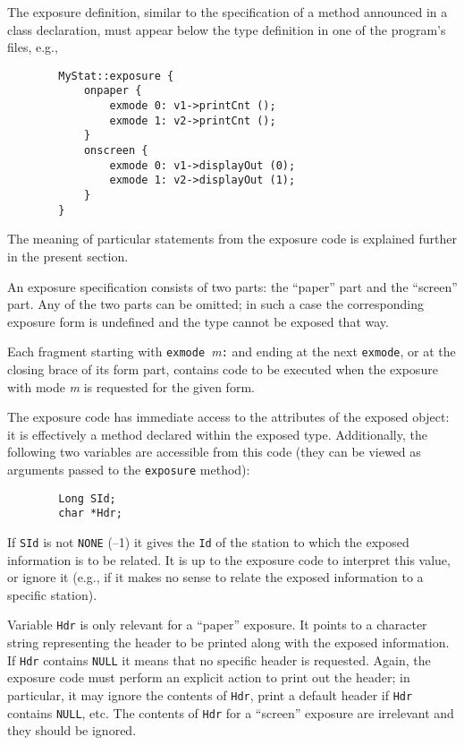 The exposure definition, similar to the specification of a method announced
in a class declaration, must appear below the type definition in one of the
program's files, e.g.,
\begin{verbatim}
        MyStat::exposure {
            onpaper {
                exmode 0: v1->printCnt ();
                exmode 1: v2->printCnt ();
            }
            onscreen {
                exmode 0: v1->displayOut (0);
                exmode 1: v2->displayOut (1);
            }
        }
\end{verbatim}
The meaning of particular statements from the exposure code is explained
further in the present section.

\medskip

\noindent
An exposure specification consists of two parts: the ``paper'' part and the
``screen'' part.
Any of the two parts can be omitted; in such a case the corresponding
exposure form is undefined and the type cannot be exposed that way.

Each fragment starting with {\tt exmode~}{\em m\/}{\tt:}
and ending at the next {\tt exmode},
or at the closing brace of its form part, contains code to be executed when
the exposure with mode {\em m\/} is requested for the given form.

The exposure code has immediate access to the attributes of
the exposed object: it is effectively a method declared within
the exposed type.
Additionally, the following two variables are accessible from this code (they
can be viewed as arguments passed to the {\tt exposure} method):
\begin{verbatim}
        Long SId;
        char *Hdr;
\end{verbatim}

If {\tt SId} is not {\tt NONE} (--1) it gives the {\tt Id} of the station
to which the exposed information is to be related.
It is up to the exposure code to interpret this value, or
ignore it (e.g., if it makes no sense to relate the exposed information to a
specific station).

Variable {\tt Hdr} is only relevant
for a ``paper'' exposure.
It points to a character string
representing the header to be printed along with the exposed information.
If {\tt Hdr} contains {\tt NULL} it means that no specific header is
requested.
Again, the exposure code must perform an explicit action to print out the
header; in particular, it may ignore the contents of {\tt Hdr}, print a
default header if {\tt Hdr} contains {\tt NULL}, etc.
The contents of {\tt Hdr} for a ``screen'' exposure are irrelevant and they
should be ignored.

